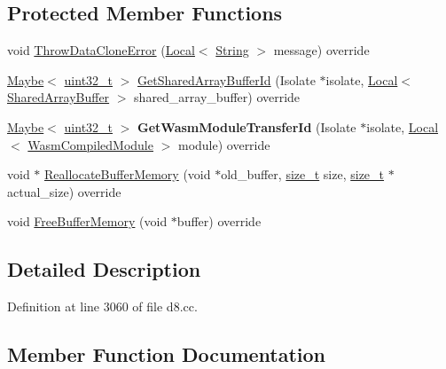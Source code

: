 \subsection*{Protected Member Functions}
\begin{DoxyCompactItemize}
\item 
void \mbox{\hyperlink{classv8_1_1Serializer_a97707713e9bfe28e117bd15d40e3afc6}{Throw\+Data\+Clone\+Error}} (\mbox{\hyperlink{classv8_1_1Local}{Local}}$<$ \mbox{\hyperlink{classv8_1_1String}{String}} $>$ message) override
\item 
\mbox{\hyperlink{classv8_1_1Maybe}{Maybe}}$<$ \mbox{\hyperlink{classuint32__t}{uint32\+\_\+t}} $>$ \mbox{\hyperlink{classv8_1_1Serializer_a573f904a1db660126a98ecec16f142be}{Get\+Shared\+Array\+Buffer\+Id}} (Isolate $\ast$isolate, \mbox{\hyperlink{classv8_1_1Local}{Local}}$<$ \mbox{\hyperlink{classv8_1_1SharedArrayBuffer}{Shared\+Array\+Buffer}} $>$ shared\+\_\+array\+\_\+buffer) override
\item 
\mbox{\label{classv8_1_1Serializer_aad4c375adc118f39322de2fc938a2015}} 
\mbox{\hyperlink{classv8_1_1Maybe}{Maybe}}$<$ \mbox{\hyperlink{classuint32__t}{uint32\+\_\+t}} $>$ {\bfseries Get\+Wasm\+Module\+Transfer\+Id} (Isolate $\ast$isolate, \mbox{\hyperlink{classv8_1_1Local}{Local}}$<$ \mbox{\hyperlink{classv8_1_1WasmCompiledModule}{Wasm\+Compiled\+Module}} $>$ module) override
\item 
void $\ast$ \mbox{\hyperlink{classv8_1_1Serializer_a0642983ee43067669e17c87411167a02}{Reallocate\+Buffer\+Memory}} (void $\ast$old\+\_\+buffer, \mbox{\hyperlink{classsize__t}{size\+\_\+t}} size, \mbox{\hyperlink{classsize__t}{size\+\_\+t}} $\ast$actual\+\_\+size) override
\item 
void \mbox{\hyperlink{classv8_1_1Serializer_af406a9e21fccfce3a5faed52182a69a6}{Free\+Buffer\+Memory}} (void $\ast$buffer) override
\end{DoxyCompactItemize}


\subsection{Detailed Description}


Definition at line 3060 of file d8.\+cc.



\subsection{Member Function Documentation}
\mbox{\label{classv8_1_1Serializer_af406a9e21fccfce3a5faed52182a69a6}} 
